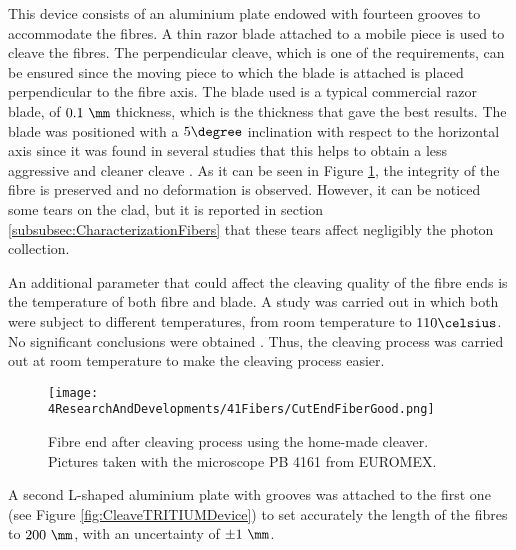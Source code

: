 This device consists of an aluminium plate endowed with fourteen grooves to accommodate the fibres. A thin razor blade attached to a mobile piece is used to cleave the fibres. The perpendicular cleave, which is one of the requirements, can be ensured since the moving piece to which the blade is attached is placed perpendicular to the fibre axis. The blade used is a typical commercial razor blade, of $0.1~\mm$ thickness, which is the thickness that gave the best results. The blade was positioned with a $5\degree$ inclination with respect to the horizontal axis since it was found in several studies that this helps to obtain a less aggressive and cleaner cleave \cite{AngleBlade, TemperatureBlade}. As it can be seen in Figure \ref{fig:CleavingFiberEnd}, the integrity of the fibre is preserved and no deformation is observed. However, it can be noticed some tears on the clad, but it is reported in section \ref{subsubsec:CharacterizationFibers} that these tears affect negligibly the photon collection. 

An additional parameter that could affect the cleaving quality of the fibre ends is the temperature of both fibre and blade. A study was carried out in which both were subject to different temperatures, from room temperature to $110\celsius$. No significant conclusions were obtained \cite{TFGAlberto}. Thus, the cleaving process was carried out at room temperature to make the cleaving process easier.

\begin{figure}[h]
\centering
\texttt{[image: 4ResearchAndDevelopments/41Fibers/CutEndFiberGood.png]}
\caption{Fibre end after cleaving process using the home-made cleaver. Pictures taken with the microscope PB 4161 from EUROMEX.\label{fig:CleavingFiberEnd}}
\end{figure}

A second L-shaped aluminium plate with grooves was attached to the first one (see Figure \ref{fig:CleaveTRITIUMDevice}) to set accurately the length of the fibres to $200~\mm$, with an uncertainty of $\pm 1~\mm$.